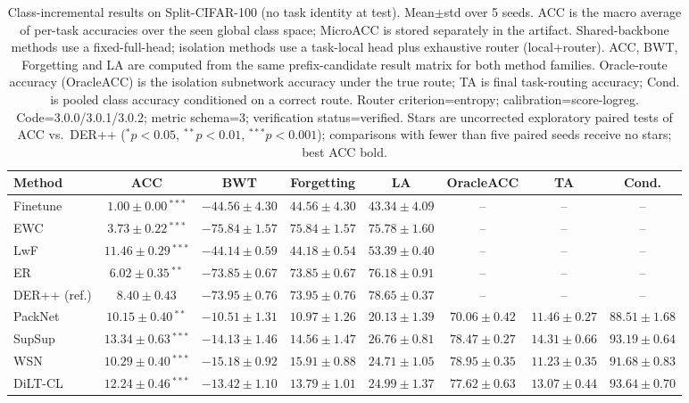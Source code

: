 \begin{table}[t]
\centering
\caption{Class-incremental results on Split-CIFAR-100 (no task identity at test). Mean$\pm$std over 5 seeds. ACC is the macro average of per-task accuracies over the seen global class space; MicroACC is stored separately in the artifact. Shared-backbone methods use a fixed-full-head; isolation methods use a task-local head plus exhaustive router (local+router). ACC, BWT, Forgetting and LA are computed from the same prefix-candidate result matrix for both method families. Oracle-route accuracy (OracleACC) is the isolation subnetwork accuracy under the true route; TA is final task-routing accuracy; Cond. is pooled class accuracy conditioned on a correct route. Router criterion=entropy; calibration=score-logreg. Code=3.0.0/3.0.1/3.0.2; metric schema=3; verification status=verified. Stars are uncorrected exploratory paired tests of ACC vs.\ DER++ ($^{*}p<0.05$, $^{**}p<0.01$, $^{***}p<0.001$); comparisons with fewer than five paired seeds receive no stars; best ACC bold.}
\label{tab:classil_cifar}
\begin{tabular}{lccccccc}
\toprule
Method & ACC & BWT & Forgetting & LA & OracleACC & TA & Cond. \\
\midrule
Finetune & $1.00\pm0.00$\,$^{***}$ & $-44.56\pm4.30$ & $44.56\pm4.30$ & $43.34\pm4.09$ & -- & -- & -- \\
EWC & $3.73\pm0.22$\,$^{***}$ & $-75.84\pm1.57$ & $75.84\pm1.57$ & $75.78\pm1.60$ & -- & -- & -- \\
LwF & $11.46\pm0.29$\,$^{***}$ & $-44.14\pm0.59$ & $44.18\pm0.54$ & $53.39\pm0.40$ & -- & -- & -- \\
ER & $6.02\pm0.35$\,$^{**}$ & $-73.85\pm0.67$ & $73.85\pm0.67$ & $76.18\pm0.91$ & -- & -- & -- \\
DER++ (ref.) & $8.40\pm0.43$ & $-73.95\pm0.76$ & $73.95\pm0.76$ & $78.65\pm0.37$ & -- & -- & -- \\
PackNet & $10.15\pm0.40$\,$^{**}$ & $-10.51\pm1.31$ & $10.97\pm1.26$ & $20.13\pm1.39$ & $70.06\pm0.42$ & $11.46\pm0.27$ & $88.51\pm1.68$ \\
SupSup & $\mathbf{13.34\pm0.63}$\,$^{***}$ & $-14.13\pm1.46$ & $14.56\pm1.47$ & $26.76\pm0.81$ & $78.47\pm0.27$ & $14.31\pm0.66$ & $93.19\pm0.64$ \\
WSN & $10.29\pm0.40$\,$^{***}$ & $-15.18\pm0.92$ & $15.91\pm0.88$ & $24.71\pm1.05$ & $78.95\pm0.35$ & $11.23\pm0.35$ & $91.68\pm0.83$ \\
DiLT-CL & $12.24\pm0.46$\,$^{***}$ & $-13.42\pm1.10$ & $13.79\pm1.01$ & $24.99\pm1.37$ & $77.62\pm0.63$ & $13.07\pm0.44$ & $93.64\pm0.70$ \\
\bottomrule
\end{tabular}
\end{table}

